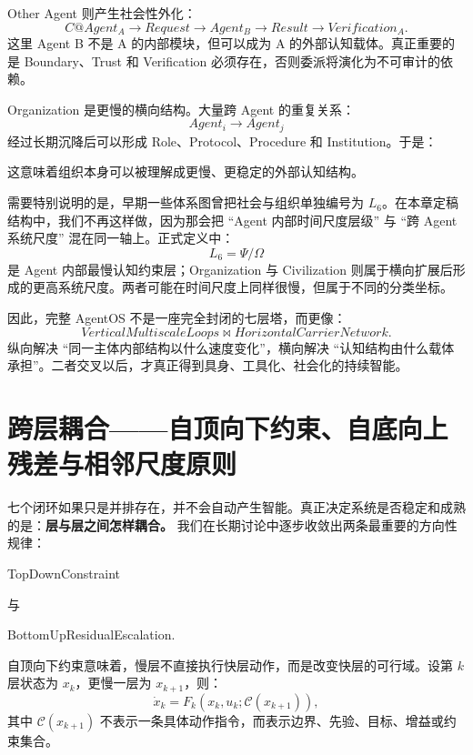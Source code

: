 Other Agent 则产生社会性外化：
\[
C@Agent_A
\rightarrow
Request
\rightarrow
Agent_B
\rightarrow
Result
\rightarrow
Verification_A.
\]
这里 Agent B 不是 A 的内部模块，但可以成为 A 的外部认知载体。真正重要的是 Boundary、Trust 和 Verification 必须存在，否则委派将演化为不可审计的依赖。

Organization 是更慢的横向结构。大量跨 Agent 的重复关系：
\[
Agent_i
\rightarrow
Agent_j
\]
经过长期沉降后可以形成 Role、Protocol、Procedure 和 Institution。于是：
\begin{statementbox}
\centering
{}
\end{statementbox}
这意味着组织本身可以被理解成更慢、更稳定的外部认知结构。

需要特别说明的是，早期一些体系图曾把社会与组织单独编号为 $L_6$。在本章定稿结构中，我们不再这样做，因为那会把 ``Agent 内部时间尺度层级'' 与 ``跨 Agent 系统尺度'' 混在同一轴上。正式定义中：
\[
L_6
=
\Psi/\Omega
\]
是 Agent 内部最慢认知约束层；Organization 与 Civilization 则属于横向扩展后形成的更高系统尺度。两者可能在时间尺度上同样很慢，但属于不同的分类坐标。

因此，完整 AgentOS 不是一座完全封闭的七层塔，而更像：
\[
\boxed{
VerticalMultiscaleLoops
\bowtie
HorizontalCarrierNetwork.
}
\]
纵向解决 ``同一主体内部结构以什么速度变化''，横向解决 ``认知结构由什么载体承担''。二者交叉以后，才真正得到具身、工具化、社会化的持续智能。

\section{跨层耦合——自顶向下约束、自底向上残差与相邻尺度原则}

七个闭环如果只是并排存在，并不会自动产生智能。真正决定系统是否稳定和成熟的是：\textbf{层与层之间怎样耦合。} 我们在长期讨论中逐步收敛出两条最重要的方向性规律：
\begin{statementbox}
TopDownConstraint
\end{statementbox}
与
\begin{statementbox}
BottomUpResidualEscalation.
\end{statementbox}

自顶向下约束意味着，慢层不直接执行快层动作，而是改变快层的可行域。设第 $k$ 层状态为 $x_k$，更慢一层为 $x_{k+1}$，则：
\[
\dot{x}_k
=
F_k
\left(
x_k,
u_k;
\mathcal C(x_{k+1})
\right),
\]
其中 $\mathcal C(x_{k+1})$ 不表示一条具体动作指令，而表示边界、先验、目标、增益或约束集合。

